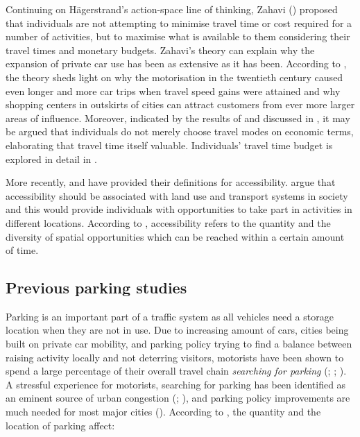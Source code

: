 Continuing on Hägerstrand's action-space line of thinking, Zahavi (\citeyear{Zahavi1974}) proposed that individuals are not attempting to minimise travel time or cost required for a number of activities, but to maximise what is available to them considering their travel times and monetary budgets. Zahavi's theory can explain why the expansion of private car use has been as extensive as it has been. According to , the theory sheds light on why the motorisation in the twentieth century caused even longer and more car trips when travel speed gains were attained and why shopping centers in outskirts of cities can attract customers from ever more larger areas of influence. Moreover, indicated by the results of  and discussed in , it may be argued that individuals do not merely choose travel modes on economic terms, elaborating that travel time itself valuable. Individuals' travel time budget is explored in detail in .

More recently,  and  have provided their definitions for accessibility. \citeauthor{Geurs2004} argue that accessibility should be associated with land use and transport systems in society and this would provide individuals with opportunities to take part in activities in different locations. According to \cite{Bertolini2003}, accessibility refers to the quantity and the diversity of spatial opportunities which can be reached within a certain amount of time.

\newpage
\subsection{Previous parking studies}
\justify

Parking is an important part of a traffic system as all vehicles need a storage location when they are not in use. Due to increasing amount of cars, cities being built on private car mobility, and parking policy trying to find a balance between raising activity locally and not deterring visitors, motorists have been shown to spend a large percentage of their overall travel chain \textit{searching for parking} (\cite{Axhausen1991}; \cite{Marsden2006}; \cite{Shoup2006}). A stressful experience for motorists, searching for parking has been identified as an eminent source of urban congestion (\cite{Axhausen1993}; \cite{Gantelet2006}), and parking policy improvements are much needed for most major cities (\cite{Benenson2008a}). According to , the quantity and the location of parking affect:

